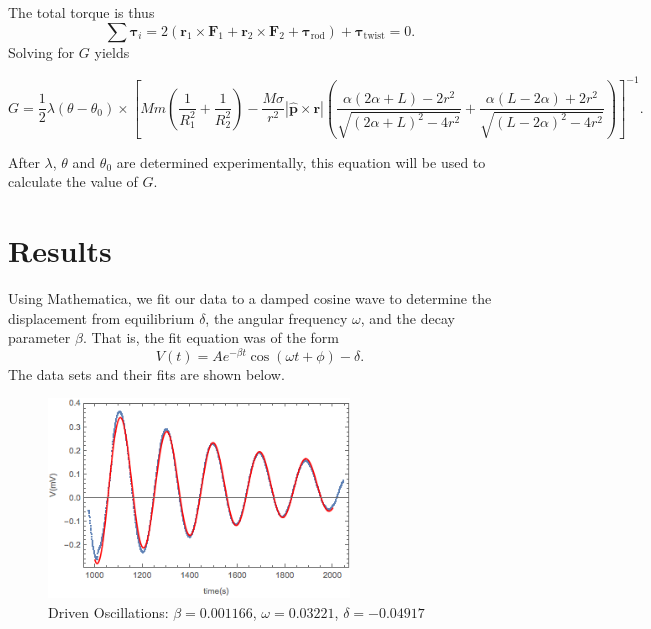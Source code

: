 \documentclass[aps, reprint,amsmath,amssymb]{revtex4-1} %
\renewcommand{\vec}[1]{\boldsymbol{#1}}
\newcommand{\uv}[1]{\vec{\hat{#1}}}
\begin{document}
The total torque is thus
\[
    \sum \vec{\tau}_i = 2(\vec{r}_1 \times \vec{F}_1 + \vec{r}_2 \times
    \vec{F}_2 + \vec{\tau}_\text{rod}) + \vec{\tau}_\text{twist} = 0.
\]
Solving for $G$ yields
\begin{widetext}
\begin{equation}
    G = \frac{1}{2} \lambda (\theta - \theta_0)
    \times \left[
        Mm \left(\frac{1}{R_1^2} + \frac{1}{R_2^2}\right)
        - \frac{M \sigma}{r^2}
        |\uv{p} \times \vec{r}| 
        \left(
        \frac{\alpha  (2 \alpha +L)-2 r^2}{\sqrt{(2 \alpha +L)^2-4
        r^2}}
        +\frac{\alpha  (L-2 \alpha ) + 2r^2}{\sqrt{(L-2 \alpha )^2-4
        r^2}}
        \right)
    \right]^{-1}.
    \label{eq:gravitational_constant}
\end{equation}
\end{widetext}
After $\lambda$, $\theta$ and $\theta_0$ are determined experimentally,
this equation will be used to calculate the value of $G$. 


\section{Results}

Using Mathematica, we fit our data to a damped cosine wave to determine the
displacement from equilibrium $\delta$, the angular frequency $\omega$, and
the decay parameter $\beta$. That is, the fit equation was of the form
\begin{equation} \label{eq:voltage_fit}
V(t) = A e^{-\beta t} \cos (\omega t + \phi) - \delta.
\end{equation}
The data sets and their fits are shown below.

\begin{figure}[b]
\centering
\includegraphics[width=8cm]{figs/drivenplot.png}
\caption{Driven Oscillations: $\beta = 0.001166$, $\omega = 0.03221$, $\delta=-0.04917$}
\label{fig:driven}
\end{figure}
\end{document}

